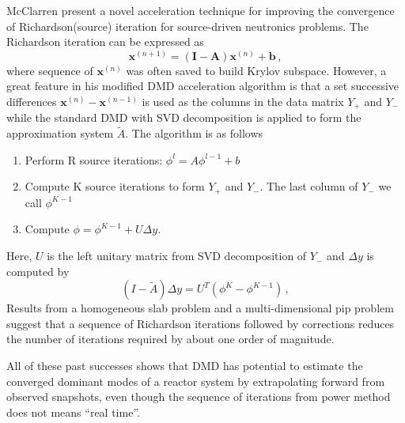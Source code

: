 McClarren present a novel acceleration technique for improving the convergence of Richardson(source) iteration for source-driven neutronics problems.\cite{mcclarren_acceleration_2018}
The Richardson iteration can be expressed as 
\begin{equation}
 \mathbf{x}^{(n+1)} = (\mathbf{I}-\mathbf{A})\mathbf{x}^{(n)} + \mathbf{b} \, ,
 \label{eq:richardson}
\end{equation}
where sequence of $\mathbf{x}^{(n)}$ was often saved to build Krylov subspace. 
However, a great feature in his modified DMD acceleration algorithm is that a set successive differences $\mathbf{x}^{(n)}-\mathbf{x}^{(n-1)}$ is used as the columns in the data matrix $Y_+$ and $Y_-$ while the standard DMD with SVD decomposition is applied to form the approximation system $\tilde{A}$.
The algorithm is as follows
\begin{enumerate}
 \item Perform R source iterations: $\phi^{l} = A \phi^{l-1} +b$
 \item Compute K source iterations to form $Y_+$ and $Y_-$. The last column of $Y_-$ we call $\phi^{K-1}$ 
 \item Compute $\phi = \phi^{K-1} + U \Delta y$.
\end{enumerate} 
Here, $U$ is the left unitary matrix from SVD decomposition of $Y_-$ and $\Delta y$ is computed by 
\begin{equation}
 (I - \tilde{A}) \Delta y = U^T(\phi^{K} - \phi^{K-1})\, ,
 \label{eq:McClarren}
\end{equation}
Results from a homogeneous slab problem and a multi-dimensional pip problem suggest that a sequence of Richardson iterations followed by corrections reduces the number of iterations required by about one order of magnitude.

All of these past successes shows that DMD has potential to estimate the converged dominant modes of a reactor system by extrapolating forward from observed snapshots, even though the sequence of iterations from power method does not means ``real time''.
